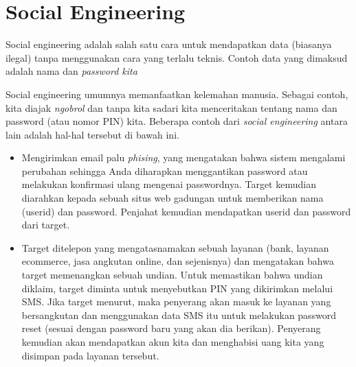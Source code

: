 \chapter{Social Engineering}
Social engineering adalah salah satu cara untuk mendapatkan data
(biasanya ilegal) tanpa menggunakan cara yang terlalu teknis.
Contoh data yang dimaksud adalah nama dan {\em password kita}

Social engineering umumnya memanfaatkan kelemahan manusia.
Sebagai contoh, kita diajak {\em ngobrol} dan tanpa kita sadari
kita menceritakan tentang nama dan password (atau nomor PIN) kita.
Beberapa contoh dari {\em social engineering} antara lain adalah
hal-hal tersebut di bawah ini.

\begin{itemize}
    \item Mengirimkan email palu {\em phising}, yang mengatakan bahwa
    sistem mengalami perubahan sehingga Anda diharapkan menggantikan
    password atau melakukan konfirmasi ulang mengenai passwordnya.
    Target kemudian diarahkan kepada sebuah situs web gadungan
    untuk memberikan nama (userid) dan password. Penjahat kemudian
    mendapatkan userid dan password dari target.
    \item Target ditelepon yang mengatasnamakan sebuah layanan
    (bank, layanan ecommerce, jasa angkutan online, dan sejenisnya)
    dan mengatakan bahwa target memenangkan sebuah undian.
    Untuk memastikan bahwa undian diklaim, target diminta untuk 
    menyebutkan PIN yang dikirimkan melalui SMS. Jika target menurut,
    maka penyerang akan masuk ke layanan yang bersangkutan dan 
    menggunakan data SMS itu untuk melakukan password reset
    (sesuai dengan password baru yang akan dia berikan).
    Penyerang kemudian akan mendapatkan akun kita dan menghabisi
    uang kita yang disimpan pada layanan tersebut.
\end{itemize}